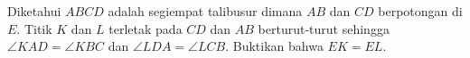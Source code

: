 Diketahui $ABCD$ adalah segiempat talibusur dimana $AB$ dan $CD$ berpotongan di $E$. Titik $K$ dan $L$ terletak pada $CD$ dan $AB$ berturut-turut sehingga $\angle KAD = \angle KBC$ dan $\angle LDA = \angle LCB$. Buktikan bahwa $EK = EL$.